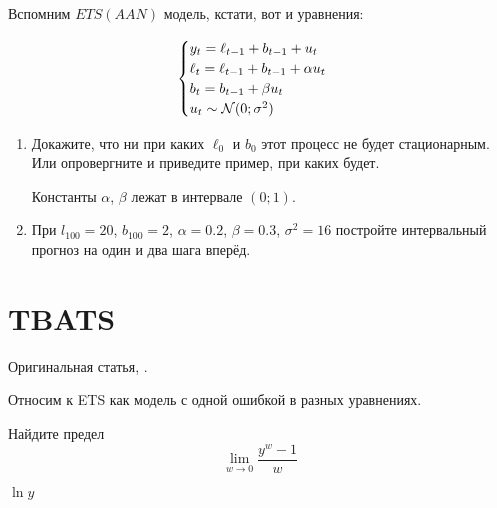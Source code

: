 \begin{problem}
Вспомним $ETS(AAN)$ модель, кстати, вот и уравнения:

\[
\begin{cases}
y_t = \ell_{t-1} + b_{t-1} + u_t \\
\ell_t = \ell_{t-1} + b_{t-1} + \alpha u_t \\
b_t = b_{t-1} + \beta u_t \\
u_t \sim \mathcal{N}(0;\sigma^2) \\
\end{cases}
\]

\begin{enumerate}
	\item 
	Докажите, что ни при каких $\ell_0$ и $b_0$ этот процесс не будет стационарным. 
	Или опровергните и приведите пример, при каких будет. 
	
	Константы $\alpha$, $\beta$ лежат в интервале $(0;1)$.
	
	\item При $l_{100} = 20$, $b_{100} = 2$, $\alpha=0.2$, $\beta=0.3$, $\sigma^2 = 16$ постройте
	интервальный прогноз на один и два шага вперёд. 
\end{enumerate}
\begin{sol}
\end{sol}
\end{problem}





\chapter{TBATS}

Оригинальная статья, \cite{de2011forecasting}.

Относим к ETS как модель с одной ошибкой в разных уравнениях. 

\begin{problem}
  Найдите предел
  \[
    \lim_{w \to 0} \frac{y^w - 1}{w}
  \]
\begin{sol}
  $\ln y$
\end{sol}
\end{problem}


